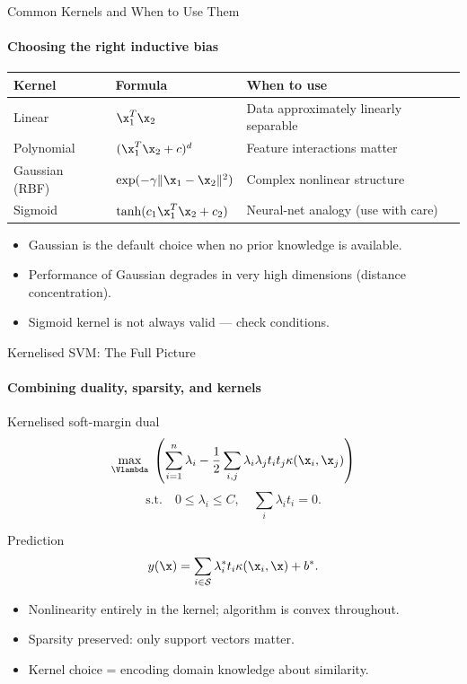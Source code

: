 \begin{frame}{Common Kernels and When to Use Them}
  \framesubtitle{Choosing the right inductive bias}
  \begin{center}
    \renewcommand{\arraystretch}{1.3}
    \begin{tabular}{lll}
      \toprule
      Kernel & Formula & When to use \\
      \midrule
      Linear & $\x_1^T\x_2$ & Data approximately linearly separable \\
      Polynomial & $(\x_1^T\x_2+c)^d$ & Feature interactions matter \\
      Gaussian (RBF) & $\exp(-\gamma\|\x_1-\x_2\|^2)$ & Complex nonlinear structure \\
      Sigmoid & $\tanh(c_1\x_1^T\x_2+c_2)$ & Neural-net analogy (use with care) \\
      \bottomrule
    \end{tabular}
  \end{center}
  \begin{itemize}
    \item Gaussian is the \alert{default choice} when no prior knowledge is available.
    \item Performance of Gaussian degrades in very high dimensions (distance concentration).
    \item Sigmoid kernel is \alert{not always valid} — check conditions.
  \end{itemize}
\end{frame}

\begin{frame}{Kernelised SVM: The Full Picture}
  \framesubtitle{Combining duality, sparsity, and kernels}
  \begin{block}{Kernelised soft-margin dual}
    \[
      \max_{\Vlambda} \;\left(\sum_{i=1}^n \lambda_i -
      \frac{1}{2}\sum_{i,j}\lambda_i\lambda_j t_i t_j \kappa(\x_i,\x_j)\right)
    \]
    \[
      \text{s.t.}\quad 0\le\lambda_i\le C,\quad \sum_i\lambda_i t_i = 0.
    \]
  \end{block}
  \begin{block}{Prediction}
    \[
      y(\x) = \sum_{i\in\mathcal{S}} \lambda_i^* t_i \kappa(\x_i,\x) + b^*.
    \]
  \end{block}
  \begin{itemize}
    \item \alert{Nonlinearity} entirely in the kernel; algorithm is convex throughout.
    \item \alert{Sparsity} preserved: only support vectors matter.
    \item \alert{Kernel choice} = encoding domain knowledge about similarity.
  \end{itemize}
\end{frame}

